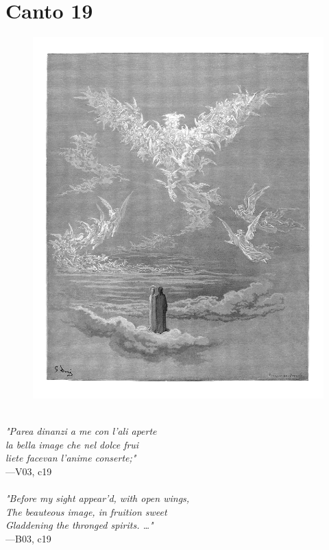\documentclass[../Dore_vision.tex]{subfiles}
\begin{document}
\newpage

\section{Canto 19}

\begin{figure}[ht]
\centering
\includegraphics[height=\figsize]{illustrations/book_3/V03, c19.jpg}
\end{figure}

\begin{center}
\begin{minipage}{0.8\linewidth}
\textit{\\
"Parea dinanzi a me con l’ali aperte\\la bella image che nel dolce frui\\liete facevan l’anime conserte;"} \\
—V03, c19 \\~\\
\textit{"Before my sight appear'd, with open wings,\\The beauteous image, in fruition sweet\\Gladdening the thronged spirits. …"} \\
—B03, c19
\end{minipage}
\end{center}
\end{document}
